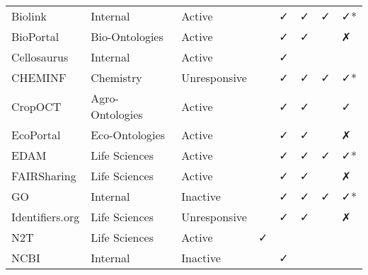 \begin{table}
\begin{tabular}{llllllll}
        Biolink &        Internal &       Active &                           &                      ✓ &                              ✓ &                           ✓ &                     ✓* \\
      BioPortal &  Bio-Ontologies &       Active &                           &                      ✓ &                              ✓ &                             &                      ✗ \\
    Cellosaurus &        Internal &       Active &                           &                      ✓ &                                &                             &                        \\
        CHEMINF &       Chemistry & Unresponsive &                           &                      ✓ &                              ✓ &                           ✓ &                     ✓* \\
        CropOCT & Agro-Ontologies &       Active &                           &                      ✓ &                              ✓ &                             &                      ✓ \\
      EcoPortal &  Eco-Ontologies &       Active &                           &                      ✓ &                              ✓ &                             &                      ✗ \\
           EDAM &   Life Sciences &       Active &                           &                      ✓ &                              ✓ &                           ✓ &                     ✓* \\
    FAIRSharing &   Life Sciences &       Active &                           &                      ✓ &                              ✓ &                             &                      ✗ \\
             GO &        Internal &     Inactive &                           &                      ✓ &                              ✓ &                           ✓ &                     ✓* \\
Identifiers.org &   Life Sciences & Unresponsive &                           &                      ✓ &                              ✓ &                             &                      ✗ \\
            N2T &   Life Sciences &       Active &                         ✓ &                        &                                &                             &                        \\
           NCBI &        Internal &     Inactive &                           &                      ✓ &                                &                             &                        \\

\end{tabular}
\end{table}
